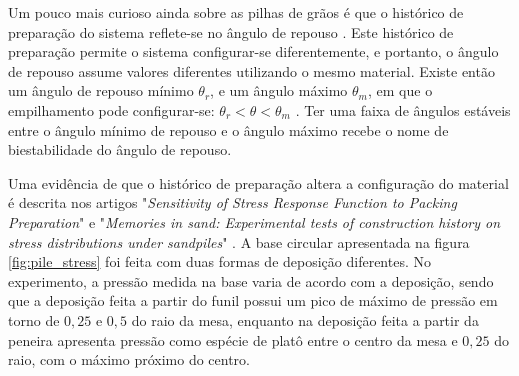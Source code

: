     Um pouco mais curioso ainda sobre as pilhas de grãos é que o histórico de preparação do sistema reflete-se no ângulo de repouso \cite{Dynamics_at_the_angle_of_repose}. Este histórico de preparação permite o sistema configurar-se diferentemente, e portanto, o ângulo de repouso assume valores diferentes utilizando o mesmo material. Existe então um ângulo de repouso mínimo $\theta _r$, e um ângulo máximo $\theta _m$, em que o empilhamento pode configurar-se: $\theta _r < \theta < \theta _m$ \cite{Granular_Physics}. Ter uma faixa de ângulos estáveis entre o ângulo mínimo de repouso e o ângulo máximo recebe o nome de biestabilidade do ângulo de repouso.

    Uma evidência de que o histórico de preparação altera a configuração do material é descrita nos artigos "\textit{Sensitivity of Stress Response Function to Packing Preparation}" e "\textit{Memories in sand: Experimental tests of construction history on stress distributions under sandpiles}" \cite{Sensitivity_of_Stress_Response_Function_to_Packing_Preparation, Memories_in_Sand}. A base circular apresentada na figura \ref{fig:pile_stress} foi feita com duas formas de deposição diferentes. No experimento, a pressão medida na base varia de acordo com a deposição, sendo que a deposição feita a partir do funil possui um pico de máximo de pressão em torno de $0,25$ e $0,5$ do raio da mesa, enquanto na deposição feita a partir da peneira apresenta pressão como espécie de platô entre o centro da mesa e $0,25$ do raio, com o máximo próximo do centro.

